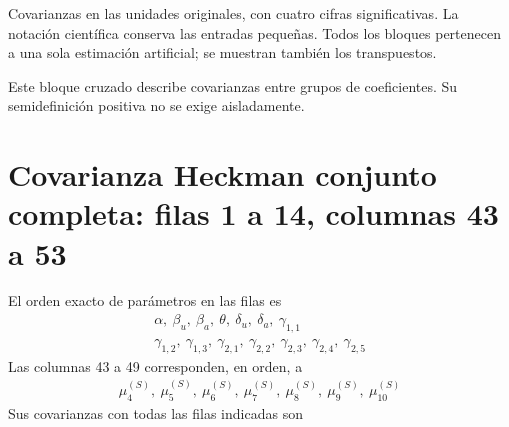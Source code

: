 \documentclass[11pt,a4paper]{article}
\begin{document}
Covarianzas en las unidades originales, con cuatro cifras significativas. La notación científica conserva las entradas pequeñas. Todos los bloques pertenecen a una sola estimación artificial; se muestran también los transpuestos.

Este bloque cruzado describe covarianzas entre grupos de coeficientes. Su semidefinición positiva no se exige aisladamente.

\clearpage
\section{Covarianza Heckman conjunto completa: filas 1 a 14, columnas 43 a 53}
El orden exacto de parámetros en las filas es
\[
\begin{gathered}\alpha,\ \beta_u,\ \beta_a,\ \theta,\ \delta_u,\ \delta_a,\ \gamma_{1,1}\\\gamma_{1,2},\ \gamma_{1,3},\ \gamma_{2,1},\ \gamma_{2,2},\ \gamma_{2,3},\ \gamma_{2,4},\ \gamma_{2,5}\end{gathered}
\]
Las columnas 43 a 49 corresponden, en orden, a
\[
\begin{gathered}\mu_4^{(S)},\ \mu_5^{(S)},\ \mu_6^{(S)},\ \mu_7^{(S)},\ \mu_8^{(S)},\ \mu_9^{(S)},\ \mu_10^{(S)}\end{gathered}
\]
Sus covarianzas con todas las filas indicadas son
\end{document}

